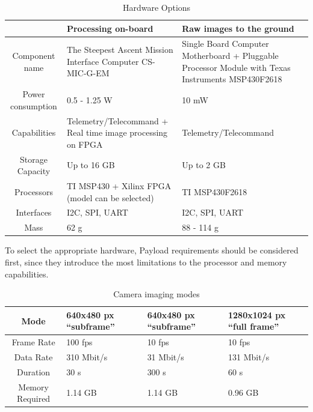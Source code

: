 \documentclass[12pt]{article}
\begin{document}
\begin{table}[ht]
\caption{Hardware Options}
\label{table:avionics_hardware_options}
\begin{center}
    \begin{tabular}{| c || p{6cm} | p{6cm} |} \hline
     &	\textbf{Processing on-board} & \textbf{Raw images to the ground} \\ \hline \hline
    Component name & The Steepest Ascent Mission Interface Computer CS-MIC-G-EM & Single Board Computer Motherboard + Pluggable Processor Module with Texas Instruments MSP430F2618 \\ \hline
    Power consumption & 0.5 - 1.25 W & 10 mW \\ \hline
    Capabilities & Telemetry/Telecommand + Real time image processing on FPGA & Telemetry/Telecommand\\ \hline
    Storage Capacity & Up to 16 GB & Up to 2 GB \\ \hline
    Processors & TI MSP430  + Xilinx FPGA (model can be selected) & TI MSP430F2618 \\ \hline
    Interfaces & I2C, SPI, UART & I2C, SPI, UART \\ \hline
    Mass & 62 g & 88 - 114 g \\ \hline 
    \end{tabular}
\end{center}
\end{table}

To select the appropriate hardware, Payload requirements should be considered first, since they introduce the most limitations to the processor and memory capabilities.

\begin{table}[ht]
\caption{Camera imaging modes}
\label{table:avionics_modes}
\begin{center}
    \begin{tabular}{| c || p{3cm} | p{3cm} | p{3cm} |} \hline
    	\textbf{Mode} & \textbf{640x480 px ``subframe''} &  \textbf{640x480 px ``subframe''} & \textbf{1280x1024 px  ``full frame''} \\ \hline \hline
    Frame Rate & 100 fps & 10 fps & 10 fps \\ \hline
    Data Rate & 310 Mbit/s & 31 Mbit/s & 131 Mbit/s \\ \hline
    Duration & 30 s & 300 s & 60 s \\ \hline
    Memory Required & 1.14 GB & 1.14 GB & 0.96 GB \\ \hline 
    \end{tabular}
\end{center}
\end{table}
\end{document}
